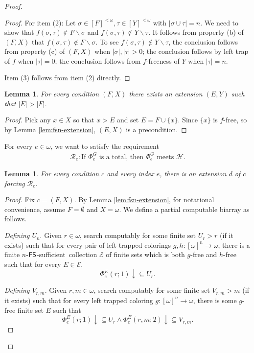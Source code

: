 \documentclass{amsart}
\newtheorem{lemma}[theorem]{Lemma}
\theoremstyle{definition}
\theoremstyle{remark}
\numberwithin{equation}{section}
\theoremstyle{noparens}
\def\mcal{\mathcal}
\newcommand{\Hcal}{\mathcal{H}}
\newcommand{\Rcal}{\mathcal{R}}
\renewcommand{\setminus}{\smallsetminus}
\newcommand{\s}[1]{\ensuremath{\sf{#1}}}
\DeclareMathOperator{\fs}{\s{FS}}
\def\fssufficient{$\fs$-sufficient}
\begin{document}
\begin{proof}
\begin{proof}
For item (2):
Let $\sigma\in [F]^{<\omega}, \tau\in [Y]^{<\omega}$
with $|\sigma\cup \tau| = n$. We need to show
that $f(\sigma, \tau)\notin F\setminus \sigma$ and $
f(\sigma,\tau)\notin Y\setminus \tau$.
It follows from property (b)
of $(F,X)$ that $f(\sigma,\tau)\notin F\setminus\sigma$.
To see $f(\sigma,\tau)\notin Y\setminus \tau$,
the conclusion follows from property (c) of $(F,X)$
when $|\sigma|,|\tau|>0$;
the conclusion follows by left trap of $f$ when
$|\tau| = 0$; the conclusion follows from $f$-freeness of $Y$
when $|\tau| = n$.

Item (3) follows from item (2) directly.
\end{proof}

\begin{lemma}\label{lem:fs2-left-trapped-preserves-1}
For every condition $(F, X)$ there exists an extension
$(E, Y)$ such that $|E| > |F|$.
\end{lemma}
\begin{proof}
Pick any $x \in X$ so that $x>E$ and set $E = F \cup \{x\}$.
Since $\{x\}$ is $f$-free, so by Lemma \ref{lem:fsn-extension}, $(E,X)$
is a precondition.
\end{proof}


For every $e \in \omega$, we want to satisfy the requirement
\begin{align}\nonumber
\Rcal_e: \text{If $\Phi^{  G}_e$ is a total,
then $\Phi^{ G}_e$ meets $\Hcal$.}
\end{align}

\begin{lemma}\label{lem:fs2-left-trapped-preserves-2}
For every condition $c$ and every index $e$,
there is an extension $d$ of $c$ forcing $\Rcal_e$.
\end{lemma}
\begin{proof}
Fix $c = (F, X)$.
By Lemma \ref{lem:fsn-extension},
for notational convenience, assume $F=\emptyset$ and $X=\omega$.
 We define a partial computable biarray as follows.

\bigskip

\emph{Defining $U_n$}.
Given $r \in \omega$, search  computably for some
finite  set $U_r>r$ (if it exists) such that
for every pair of left trapped colorings $g, h : [\omega]^n \to \omega$,
there is a finite $n$-\fssufficient\ collection
$\mcal{E}$ of finite sets which is both $g$-free and $h$-free such that for every $E\in\mcal{E}$,
$$
\Phi_e^{E }(r;1) \downarrow \subseteq U_r.
$$

\emph{Defining $V_{r,m}$}. Given $r, m \in \omega$, search  computably for some
finite  set $V_{r,m}>m$ (if it exists) such that for every
left trapped coloring $g : [\omega]^n \to \omega$,
there is some $g$-free finite set $E$ such that
$$
\Phi_e^{E}(r;1) \downarrow \subseteq U_r
	\wedge \Phi_e^{E}(r, m;2) \downarrow \subseteq V_{r,m}.
$$
\smallskip


\end{proof}
\end{proof}
\end{document}
